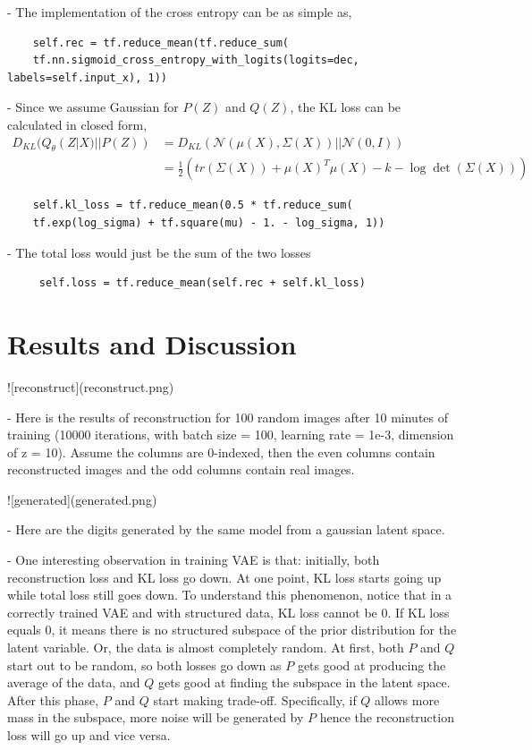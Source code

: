 \documentclass[graybox]{svmult}
\begin{document}
- The implementation of the cross entropy can be as simple as,

\begin{verbatim}
    self.rec = tf.reduce_mean(tf.reduce_sum(
    tf.nn.sigmoid_cross_entropy_with_logits(logits=dec, labels=self.input_x), 1))
\end{verbatim}

- Since we assume Gaussian for $P(Z)$ and $Q(Z)$, the KL loss can be calculated in closed form,
\[
\begin{aligned}
D_{KL}(Q_{\theta}(Z|X)||P(Z)) & = D_{KL}(\mathcal{N}(\mu(X), \Sigma(X))||\mathcal{N}(0, I)) \\
& = \frac{1}{2}(tr(\Sigma(X)) + \mu(X)^T\mu(X) - k - \log \det(\Sigma(X)))
\end{aligned}
\]

\begin{verbatim}
    self.kl_loss = tf.reduce_mean(0.5 * tf.reduce_sum(
    tf.exp(log_sigma) + tf.square(mu) - 1. - log_sigma, 1))
\end{verbatim}

- The total loss would just be the sum of the two losses

\begin{verbatim}
     self.loss = tf.reduce_mean(self.rec + self.kl_loss)
\end{verbatim}

\section{Results and Discussion}

  ![reconstruct](reconstruct.png)
  
 - Here is the results of reconstruction for 100 random images after 10 minutes of training (10000 iterations, with batch size = 100, learning rate = 1e-3, dimension of z = 10). Assume the columns are 0-indexed, then the even columns contain reconstructed images and the odd columns contain real images.

 ![generated](generated.png)
 
 - Here are the digits generated by the same model from a gaussian latent space.
 
 - One interesting observation in training VAE is that: initially, both reconstruction loss and KL loss go down. At one point, KL loss starts going up while total loss still goes down. To understand this phenomenon, notice that in a correctly trained VAE and with structured data, KL loss cannot be 0. If KL loss equals 0, it means there is no structured subspace of the prior distribution for the latent variable. Or, the data is almost completely random. At first, both $P$ and $Q$ start out to be random, so both losses go down as $P$ gets good at producing the average of the data, and $Q$ gets good at finding the subspace in the latent space. After this phase, $P$ and $Q$ start making trade-off. Specifically, if $Q$ allows more mass in the subspace, more noise will be generated by $P$ hence the reconstruction loss will go up and vice versa.
 
\end{document}
